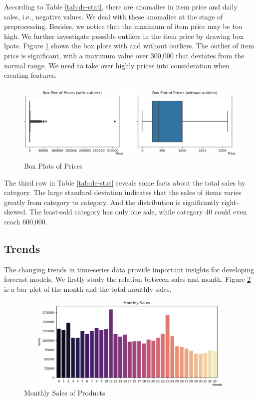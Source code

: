 \documentclass{article}
\begin{document}
According to Table \ref{tab:de-stat}, there are anomalies in item price and daily sales, i.e., negative values. We deal with these anomalies at the stage of preprocessing. Besides, we notice that the maximum of item price may be too high. We further investigate possible outliers in the item price by drawing box lpots. Figure \ref{fig:price-box} shows the box plots with and without outliers. The outlier of item price is significant, with a maximum value over 300,000 that deviates from the normal range. We need to take over highly prices into consideration when creating features. 

\begin{figure}[!ht]
    \centering
    \includegraphics[width=14cm, height=3.8cm]{./figs/price-box.png}
    \caption{Box Plots of Prices}
    \label{fig:price-box}
\end{figure}

The third row in Table \ref{tab:de-stat} reveals some facts about the total sales by category. The large standard deviation indicates that the sales of items varies greatly from category to category. And the distribution is significantly right-skewed. The least-sold category has only one sale, while category 40 could even reach 600,000.


\subsection{Trends}
The changing trends in time-series data provide important insights for developing forecast models. We firstly study the relation between sales and month. Figure \ref{fig:month-sales} is a bar plot of the month and the total monthly sales.

\begin{figure}[!ht]
    \centering
    \includegraphics[width=12cm, height=4.5cm]{./figs/month-sales.png}
    \caption{Monthly Sales of Products}
    \label{fig:month-sales}
\end{figure}
\end{document}
